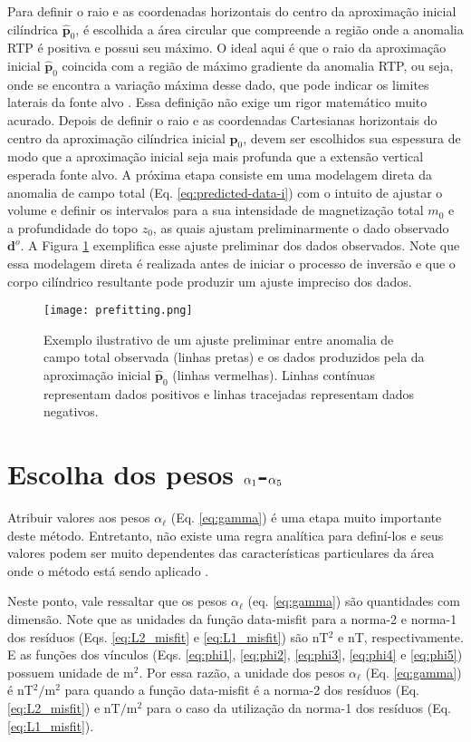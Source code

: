 Para definir o raio e as coordenadas horizontais do centro da aproximação inicial cilíndrica $ \hat{\mathbf{p}}_0 $, é escolhida a área circular que compreende a região onde a anomalia RTP é positiva e possui seu máximo.
O ideal aqui é que o raio da aproximação inicial $ \hat{\mathbf{p}}_0 $ coincida com a região de máximo gradiente da anomalia RTP, ou seja, onde se encontra a variação máxima desse dado, que pode indicar os limites laterais da fonte alvo \citep{baranov1957}.
Essa definição não exige um rigor matemático muito acurado.
Depois de definir o raio e as coordenadas Cartesianas horizontais do centro da aproximação cilíndrica inicial $ \hat{\mathbf{p}}_0 $, devem ser escolhidos sua espessura de modo que a aproximação inicial seja mais profunda que a extensão vertical esperada fonte alvo.
A próxima etapa consiste em uma modelagem direta da anomalia de campo total (Eq. \ref{eq:predicted-data-i}) com o intuito de ajustar o volume e definir os intervalos para a sua intensidade de magnetização total $m_{0}$ e a profundidade do topo $z_{0}$, as quais ajustam preliminarmente o dado observado $ \mathbf{d}^o $.
A Figura \ref{fig:prefit} exemplifica esse ajuste preliminar dos dados observados.
Note que essa modelagem direta é realizada antes de iniciar o processo de inversão e 
que o corpo cilíndrico resultante pode produzir um ajuste impreciso dos dados.

\begin{figure}[!htb]
	\centering
	\texttt{[image: prefitting.png]}
	\caption{Exemplo ilustrativo de um ajuste preliminar entre anomalia de campo total observada (linhas pretas) e os dados produzidos pela da aproximação inicial $ \hat{\mathbf{p}}_0 $ (linhas vermelhas). Linhas contínuas representam dados positivos e linhas tracejadas representam dados negativos.}
	\label{fig:prefit}
\end{figure}

\section{Escolha dos pesos $\boldmath{\alpha}_{1}$-$\boldmath{\alpha}_{5}$}

Atribuir valores aos pesos $ \alpha_{\ell} $ (Eq. \ref{eq:gamma}) é uma etapa muito importante deste método.
Entretanto, não existe uma regra analítica para definí-los e seus valores podem ser muito dependentes das características particulares da área onde o método está sendo aplicado \cite[]{silva-2001,bastos-2020}.

Neste ponto, vale ressaltar que os pesos $ \alpha_{\ell}$ (eq. \ref{eq:gamma}) são quantidades com dimensão.
Note que as unidades da função data-misfit para a norma-2 e norma-1 dos resíduos (Eqs. \ref{eq:L2_misfit} e \ref{eq:L1_misfit}) são nT$^2$ e nT, respectivamente.
E as funções dos vínculos (Eqs. \ref{eq:phi1}, \ref{eq:phi2}, \ref{eq:phi3}, \ref{eq:phi4} e \ref{eq:phi5}) possuem unidade de m$^2$.
Por essa razão, a unidade dos pesos $ \alpha_{\ell} $ (Eq. \ref{eq:gamma}) é nT$^{2}/$m$^{2}$ para quando a função data-misfit é a norma-2 dos resíduos (Eq. \ref{eq:L2_misfit}) e nT$/$m$^{2}$ para o caso da utilização da norma-1 dos resíduos (Eq. \ref{eq:L1_misfit}).

